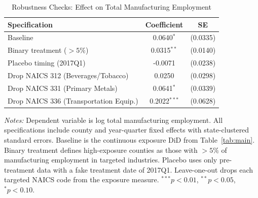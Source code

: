 \begin{table}[htbp]
\centering
\caption{Robustness Checks: Effect on Total Manufacturing Employment}
\label{tab:robustness}
\begin{tabular}{lcc}
\toprule
Specification & Coefficient & SE \\
\midrule
Baseline & 0.0640$^{*}$ & (0.0335) \\
Binary treatment ($>5\%$) & 0.0315$^{**}$ & (0.0140) \\
Placebo timing (2017Q1) & -0.0071 & (0.0238) \\
Drop NAICS 312 (Beverages/Tobacco) & 0.0250 & (0.0298) \\
Drop NAICS 331 (Primary Metals) & 0.0641$^{*}$ & (0.0339) \\
Drop NAICS 336 (Transportation Equip.) & 0.2022$^{***}$ & (0.0628) \\
\bottomrule
\end{tabular}
\begin{tablenotes}[flushleft]
\small
\item \textit{Notes:} Dependent variable is log total manufacturing employment. All specifications include county and year-quarter fixed effects with state-clustered standard errors. Baseline is the continuous exposure DiD from Table~\ref{tab:main}. Binary treatment defines high-exposure counties as those with $>5\%$ of manufacturing employment in targeted industries. Placebo uses only pre-treatment data with a fake treatment date of 2017Q1. Leave-one-out drops each targeted NAICS code from the exposure measure. $^{***}p<0.01$, $^{**}p<0.05$, $^{*}p<0.10$.
\end{tablenotes}
\end{table}
